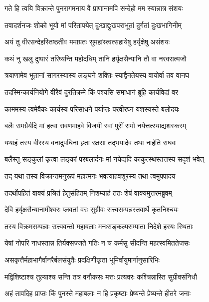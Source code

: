 \twolineshloka
{गते हि त्वयि विक्रान्ते पुनरागमनाय वै}
{प्राणानामपि सन्देहो मम स्यान्नात्र संशयः} %

\twolineshloka
{तवादर्शनजः शोको भूयो मां परितापयेत्}
{दुःखाद्दुःखपराभूतां दुर्गतां दुःखभागिनीम्} %

\twolineshloka
{अयं तु वीरसन्देहस्तिष्ठतीव ममाग्रतः}
{सुमहांस्त्वत्सहायेषु हर्यृक्षेषु असंशयः} %

\twolineshloka
{कथं नु खलु दुष्पारं तरिष्यन्ति महोदधिम्}
{तानि हर्यृक्षसैन्यानि तौ वा नरवरात्मजौ} %

\twolineshloka
{त्रयाणामेव भूतानां सागरस्यास्य लङ्घने}
{शक्तिः स्याद्वैनतेयस्य वायोर्वा तव वानघ} %

\twolineshloka
{तदस्मिन्कार्यनियोगे वीरैवं दुरतिक्रमे}
{किं पश्यसि समाधानं ब्रूहि कार्यविदां वर} %

\twolineshloka
{काममस्य त्वमेवैकः कार्यस्य परिसाधने}
{पर्याप्तः परवीरघ्न यशस्यस्ते बलोदयः} %

\twolineshloka
{बलैः समग्रैर्यदि मां हत्वा रावणमाहवे}
{विजयी स्वां पुरीं रामो नयेत्तत्स्याद्यशस्करम्} %

\twolineshloka
{यथाहं तस्य वीरस्य वनादुपधिना हृता}
{रक्षसा तद्भयादेव तथा नार्हति राघवः} %

\twolineshloka
{बलैस्तु सङ्कुलां कृत्वा लङ्कां परबलार्दनः}
{मां नयेद्यदि काकुत्स्थस्तत्तस्य सदृशं भवेत्} %

\twolineshloka
{तद् यथा तस्य विक्रान्तमनुरूपं महात्मनः}
{भवत्याहवशूरस्य तथा त्वमुपपादय} %

\twolineshloka
{तदर्थोपहितं वाक्यं प्रश्रितं हेतुसंहितम्}
{निशम्याहं ततः शेषं वाक्यमुत्तरमब्रुवम्} %

\twolineshloka
{देवि हर्यृक्षसैन्यानामीश्वरः प्लवतां वरः}
{सुग्रीवः सत्त्वसम्पन्नस्तवार्थे कृतनिश्चयः} %

\twolineshloka
{तस्य विक्रमसम्पन्नाः सत्त्ववन्तो महाबलाः}
{मनःसङ्कल्पसम्पाता निदेशे हरयः स्थिताः} %

\twolineshloka
{येषां नोपरि नाधस्तान्न तिर्यक्सज्जते गतिः}
{न च कर्मसु सीदन्ति महत्स्वमिततेजसः} %

\twolineshloka
{असकृत्तैर्महाभागैर्वानरैर्बलसंयुतैः}
{प्रदक्षिणीकृता भूमिर्वायुमार्गानुसारिभिः} %

\twolineshloka
{मद्विशिष्टाश्च तुल्याश्च सन्ति तत्र वनौकसः}
{मत्तः प्रत्यवरः कश्चिन्नास्ति सुग्रीवसंनिधौ} %

\twolineshloka
{अहं तावदिह प्राप्तः किं पुनस्ते महाबलाः}
{न हि प्रकृष्टाः प्रेष्यन्ते प्रेष्यन्ते हीतरे जनाः} %

